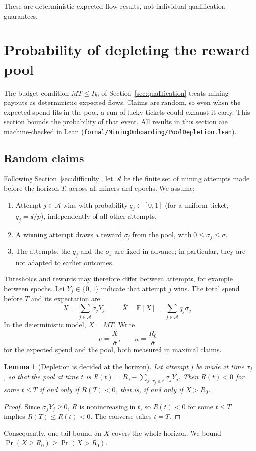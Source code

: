 \documentclass[11pt,a4paper]{article}
\newtheorem{lemma}[theorem]{Lemma}
\begin{document}
These are deterministic expected-flow results, not individual qualification guarantees.

\section{Probability of depleting the reward pool}\label{sec:depletion}
The budget condition $MT\le R_0$ of Section~\ref{sec:qualification} treats mining payouts as deterministic expected flows. Claims are random, so even when the expected spend fits in the pool, a run of lucky tickets could exhaust it early. This section bounds the probability of that event. All results in this section are machine-checked in Lean (\texttt{formal/MiningOnboarding/PoolDepletion.lean}).

\subsection{Random claims}
Following Section~\ref{sec:difficulty}, let $\mathcal A$ be the finite set of mining attempts made before the horizon $T$, across all miners and epochs. We assume:
\begin{enumerate}
\item Attempt $j\in\mathcal A$ wins with probability $q_j\in[0,1]$ (for a uniform ticket, $q_j=d/p$), independently of all other attempts.
\item A winning attempt draws a reward $\sigma_j$ from the pool, with $0\le\sigma_j\le\bar\sigma$.
\item The attempts, the $q_j$ and the $\sigma_j$ are fixed in advance; in particular, they are not adapted to earlier outcomes.
\end{enumerate}
Thresholds and rewards may therefore differ between attempts, for example between epochs. Let $Y_j\in\{0,1\}$ indicate that attempt $j$ wins. The total spend before $T$ and its expectation are
\begin{equation}
X=\sum_{j\in\mathcal A}\sigma_jY_j,\qquad \bar X=\mathbb E[X]=\sum_{j\in\mathcal A}q_j\sigma_j.
\end{equation}
In the deterministic model, $\bar X=MT$. Write
\begin{equation}
\nu=\frac{\bar X}{\bar\sigma},\qquad \kappa=\frac{R_0}{\bar\sigma}
\end{equation}
for the expected spend and the pool, both measured in maximal claims.

\begin{lemma}[Depletion is decided at the horizon]\label{lem:depletion-horizon}
Let attempt $j$ be made at time $\tau_j$, so that the pool at time $t$ is $R(t)=R_0-\sum_{j:\,\tau_j\le t}\sigma_jY_j$. Then $R(t)<0$ for some $t\le T$ if and only if $R(T)<0$, that is, if and only if $X>R_0$.
\end{lemma}
\begin{proof}
Since $\sigma_jY_j\ge0$, $R$ is nonincreasing in $t$, so $R(t)<0$ for some $t\le T$ implies $R(T)\le R(t)<0$. The converse takes $t=T$.
\end{proof}
Consequently, one tail bound on $X$ covers the whole horizon. We bound $\Pr(X\ge R_0)\ge\Pr(X>R_0)$.
\end{document}
